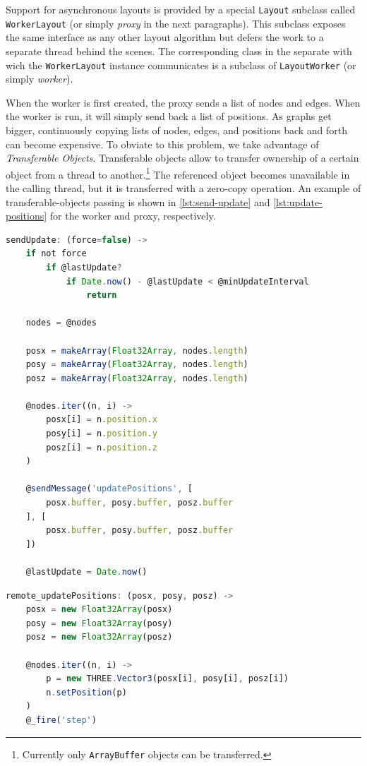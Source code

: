 Support for asynchronous layouts is provided by a special \texttt{Layout} subclass called \texttt{Worker\BreakableSlash{}Layout} (or simply \emph{proxy} in the next paragraphs). This subclass exposes the same interface as any other layout algorithm but defers the work to a separate thread behind the scenes. The corresponding class in the separate with wich the \texttt{WorkerLayout} instance communicates is a subclass of \texttt{LayoutWorker} (or simply \emph{worker}).

When the worker is first created, the proxy sends a list of nodes and edges. When the worker is run, it will simply send back a list of positions. As graphs get bigger, continuously copying lists of nodes, edges, and positions back and forth can become expensive. To obviate to this problem, we take advantage of \emph{Transferable Objects}. Transferable objects allow to transfer ownership of a certain object from a thread to another.\footnote{Currently only \texttt{ArrayBuffer} objects can be transferred.} The referenced object becomes unavailable in the calling thread, but it is transferred with a zero-copy operation. An example of transferable-objects passing is shown in \vref{lst:send-update} and \vref{lst:update-positions} for the worker and proxy, respectively.

\begin{lstlisting}[caption={Method used to send position updates from the worker to the proxy.},label=lst:send-update,language=javascript]
sendUpdate: (force=false) ->
    if not force
        if @lastUpdate?
            if Date.now() - @lastUpdate < @minUpdateInterval
                return

    nodes = @nodes

    posx = makeArray(Float32Array, nodes.length)
    posy = makeArray(Float32Array, nodes.length)
    posz = makeArray(Float32Array, nodes.length)

    @nodes.iter((n, i) ->
        posx[i] = n.position.x
        posy[i] = n.position.y
        posz[i] = n.position.z
    )

    @sendMessage('updatePositions', [
        posx.buffer, posy.buffer, posz.buffer
    ], [
        posx.buffer, posy.buffer, posz.buffer
    ])

    @lastUpdate = Date.now()
\end{lstlisting}

\begin{lstlisting}[caption={Method handling the positions update messages on the proxy.},label=lst:update-positions,language=javascript]
remote_updatePositions: (posx, posy, posz) ->
    posx = new Float32Array(posx)
    posy = new Float32Array(posy)
    posz = new Float32Array(posz)

    @nodes.iter((n, i) ->
        p = new THREE.Vector3(posx[i], posy[i], posz[i])
        n.setPosition(p)
    )
    @_fire('step')
\end{lstlisting}

